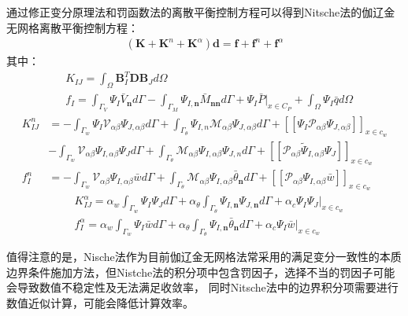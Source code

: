 通过修正变分原理法和罚函数法的离散平衡控制方程可以得到Nitsche法的伽辽金无网格离散平衡控制方程：
\begin{equation}
\begin{split}
    (\pmb{K}+\pmb{K}^n+\pmb{K}^{\alpha})\pmb{d}=\pmb{f}+\pmb{f}^n+\pmb{f}^{\alpha}
\end{split}
\end{equation}
其中：
\begin{equation}
\begin{split}
    &K_{IJ}=\int_{\Omega}\pmb{B}^T_I\pmb{D}\pmb{B}_Jd\Omega\\
    &f_I=\int_{\Gamma_V}\Psi_I\bar{V}_{\pmb{n}}d\Gamma-\int_{\Gamma_M}\Psi_{I,\pmb{n}}\bar{M}_{\pmb{nn}}d\Gamma+\Psi_I\bar{P}\vert_{x\in C_P}+\int_{\Omega}\Psi_I\bar{q}d\Omega
\end{split}
\end{equation}
\begin{equation}
\begin{split}
     K^n_{IJ}&=-\int_{\Gamma_w}\Psi_I\mathcal{V}_{\alpha\beta}\Psi_{J,\alpha\beta}d\Gamma+\int_{\Gamma_{\theta}}\Psi_{I,n}\mathcal{M}_{\alpha\beta}\Psi_{J,\alpha\beta}d\Gamma+[[\Psi_I\mathcal{P}_{\alpha\beta}\Psi_{J,\alpha\beta}]]_{x\in{c_w}}\\
     &-\int_{\Gamma_w}\mathcal{V}_{\alpha\beta}\Psi_{I,\alpha\beta}\Psi_Jd\Gamma+\int_{\Gamma_{\theta}}\mathcal{M}_{\alpha\beta}\Psi_{I,\alpha\beta}\Psi_{J,n}d\Gamma+[[\mathcal{P}_{\alpha\beta}\tilde{\Psi}_{I,\alpha\beta}\Psi_J]]_{x\in{c_w}}\\
     f_{I}^n&=-\int_{\Gamma_w}\mathcal{V}_{\alpha\beta}\Psi_{I,\alpha\beta}\bar{w}d\Gamma+\int_{\Gamma_{\theta}}\mathcal{M}_{\alpha\beta}\Psi_{I,\alpha\beta}\bar{\theta}_{\pmb n}d\Gamma+[[\mathcal{P}_{\alpha\beta}\Psi_{I,\alpha\beta}\bar{w}]]_{x\in{c_w}}
\end{split}
\end{equation}
\begin{equation}
\begin{split}
   &K^{\alpha}_{IJ}=\alpha_w\int_{\Gamma_w}\Psi_I\Psi_Jd\Gamma+\alpha_{\theta}\int_{\Gamma_{\theta}}\Psi_{I,\pmb n}\Psi_{J,\pmb n}d\Gamma+\alpha_c\Psi_I\Psi_J\vert_{x\in c_w}\\
&f^{\alpha}_I=\alpha_w\int_{\Gamma_w}\Psi_I\bar{w}d\Gamma+\alpha_{\theta}\int_{\Gamma_{\theta}}\Psi_{I,\pmb n}\bar{\theta}_{\pmb n}d\Gamma+\alpha_c\Psi_I\bar{w}\vert_{x\in c_w}
\end{split}
\end{equation}\par
值得注意的是，Nische法作为目前伽辽金无网格法常采用的满足变分一致性的本质边界条件施加方法，但Nistche法的积分项中包含罚因子，选择不当的罚因子可能会导致数值不稳定性及无法满足收敛率，
同时Nitsche法中的边界积分项需要进行数值近似计算，可能会降低计算效率。
